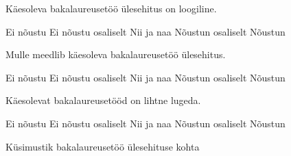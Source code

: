 \documentclass[a4paper,12pt,oneside]{article}
\numberwithin{equation}{section}
\theoremstyle{definition}
\begin{document}
\begin{figure}[H]

\colorbox{background_example}{\parbox{\textwidth}{

\vspace{1mm}

Käesoleva bakalaureusetöö \"ulesehitus on loogiline.

\vspace{5pt}


\begin{Form}
\def\DefaultWidthofChoiceMenu{12pt}%
\small{
\CheckBox[bordercolor = gray,name=optionE1]{\mbox{}} Ei nõustu 
\CheckBox[bordercolor = gray,name=optionD1]{\mbox{}} Ei nõustu osaliselt
\CheckBox[bordercolor = gray,name=optionC1]{\mbox{}} Nii ja naa
\CheckBox[bordercolor = gray,name=optionC1]{\mbox{}}  Nõustun osaliselt
\CheckBox[bordercolor = gray,name=optionC1]{\mbox{}} Nõustun
}
\end{Form}

\vspace{10pt}

Mulle meedlib käesoleva bakalaureusetöö ülesehitus.

\vspace{5pt}

\begin{Form}
\def\DefaultWidthofChoiceMenu{12pt}%
\small{
\CheckBox[bordercolor = gray,name=optionE1]{\mbox{}} Ei nõustu 
\CheckBox[bordercolor = gray,name=optionD1]{\mbox{}} Ei nõustu osaliselt
\CheckBox[bordercolor = gray,name=optionC1]{\mbox{}} Nii ja naa
\CheckBox[bordercolor = gray,name=optionC1]{\mbox{}}  Nõustun osaliselt
\CheckBox[bordercolor = gray,name=optionC1]{\mbox{}} Nõustun
}
\end{Form}

\vspace{10pt}

Käesolevat bakalaureusetööd on lihtne lugeda.

\vspace{5pt}

\begin{Form}
\def\DefaultWidthofChoiceMenu{12pt}%
\small{
\CheckBox[bordercolor = gray,name=optionE1]{\mbox{}} Ei nõustu 
\CheckBox[bordercolor = gray,name=optionD1]{\mbox{}} Ei nõustu osaliselt
\CheckBox[bordercolor = gray,name=optionC1]{\mbox{}} Nii ja naa
\CheckBox[bordercolor = gray,name=optionC1]{\mbox{}}  Nõustun osaliselt
\CheckBox[bordercolor = gray,name=optionC1]{\mbox{}} Nõustun
}
\end{Form}

\vspace{2pt}

}}
\caption{K\"usimustik bakalaureusetöö \"ulesehituse kohta }
\label{quiz_consistency}
\end{figure}
\end{document}
